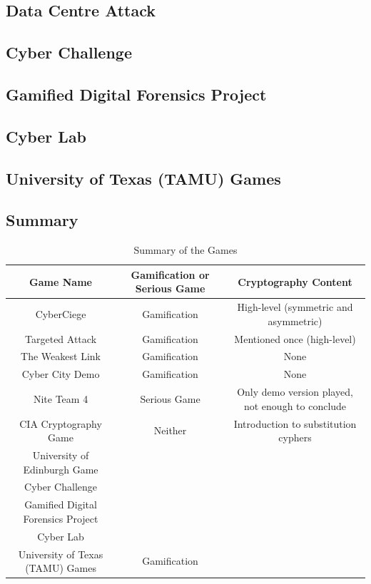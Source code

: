 \documentclass{l4proj}
\begin{document}
\subsection{Data Centre Attack}



\subsection{Cyber Challenge}



\subsection{Gamified Digital Forensics Project}



\subsection{Cyber Lab}



\subsection{University of Texas (TAMU) Games}



\subsection{Summary}


\begin{table}[]
    \begin{tabular}{|c|c|c|}
        \hline
        \textbf{Game Name} & \textbf{Gamification or Serious Game} & \textbf{Cryptography Content} \\
        \hline
        CyberCiege & Gamification & High-level (symmetric and asymmetric) \\
        \hline
        Targeted Attack & Gamification & Mentioned once (high-level) \\
        \hline
        The Weakest Link & Gamification & None \\
        \hline
        Cyber City Demo & Gamification & None \\
        \hline
        Nite Team 4 & Serious Game & Only demo version played, not enough to conclude \\
        \hline
        CIA Cryptography Game & Neither & Introduction to substitution cyphers\\
        \hline
        University of Edinburgh Game & & \\
        \hline
        Cyber Challenge & & \\
        \hline
        Gamified Digital Forensics Project & & \\
        \hline
        Cyber Lab & & \\
        \hline
        University of Texas (TAMU) Games & Gamification & \\
        \hline        
    \end{tabular}
    \caption{Summary of the Games}\label{tab:games}
\end{table}
\end{document}
